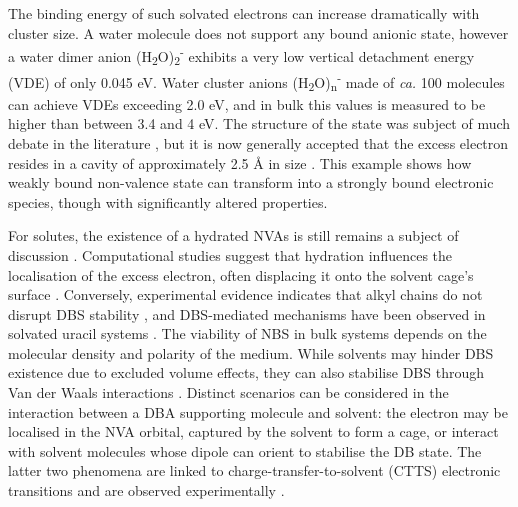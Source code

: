 The binding energy of such solvated electrons can increase dramatically with cluster size. A water molecule does not support any bound anionic state\cite{herbert2015quantum}, however a water dimer anion (H\textsubscript{2}O)\textsubscript{2}\textsuperscript{-} exhibits a very low vertical detachment energy (VDE) of only 0.045 eV\cite{coe1990photoelectron,lee1991negative}. Water cluster anions (H\textsubscript{2}O)\textsubscript{n}\textsuperscript{-} made of \emph{ca.} 100 molecules can achieve VDEs exceeding 2.0 eV\cite{verlet2005observation,ma2009low}, and in bulk this values is measured to be higher than between 3.4 and 4 eV\cite{ma2009low,coe2008photoelectron,siefermann2010binding}. The structure of the state was subject of much debate in the literature \cite{herbert2017hydrated,kumar2015simple,herbert2019structure,herbert2017hydrated,kevan1981solvated}, but it is now generally accepted that the excess electron resides in a cavity of approximately 2.5 \r{A} in size \cite{herbert2017hydrated,herbert2019structure}. This example shows how weakly bound non-valence state can transform into a strongly bound electronic species, though with significantly altered properties. 

For solutes, the existence of a hydrated NVAs is still remains a subject of discussion \cite{anusiewicz2020fate,castellani2019stability,larsen2010does}. Computational studies suggest that hydration influences the localisation of the excess electron, often displacing it onto the solvent cage's surface \cite{anusiewicz2020fate}. Conversely, experimental evidence indicates that alkyl chains do not disrupt DBS stability \cite{castellani2019stability}, and DBS-mediated mechanisms have been observed in solvated uracil systems \cite{narayanan2024electron}. The viability of NBS in bulk systems depends on the molecular density and polarity of the medium. While solvents may hinder DBS existence due to excluded volume effects, they can also stabilise DBS through Van der Waals interactions \cite{bradforth2002excited,chen2000precursors}. Distinct scenarios can be considered in the interaction between a DBA supporting molecule and solvent: the electron may be localised in the NVA orbital, captured by the solvent to form a cage, or interact with solvent molecules whose dipole can orient to stabilise the DB state. The latter two phenomena are linked to charge-transfer-to-solvent (CTTS) electronic transitions and are observed experimentally \cite{staib1996reaction,chen2000precursors,bradforth2002excited,chen2008ultrafast,messina2013real,carter2023birth,lan2024dynamics}.

